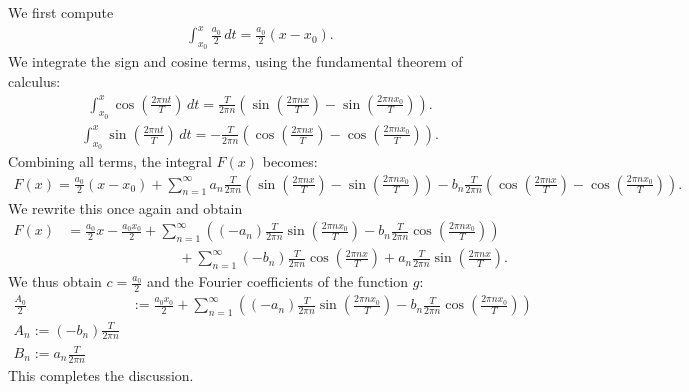 \documentclass[11pt]{article}
\begin{document}
\begin{solution}
    We first compute 
    \begin{gather*}
        \int_{x_0}^x \frac{a_0}{2} \, dt = \frac{a_0}{2} (x - x_0).
    \end{gather*}
    We integrate the sign and cosine terms, using the fundamental theorem of calculus:
    \begin{gather*}
        \int_{x_0}^x \cos\left(\frac{2\pi n t}{T}\right) \, dt 
        = 
        \frac{T}{2\pi n} \left( \sin\left(\frac{2\pi n x}{T}\right) - \sin\left(\frac{2\pi n x_0}{T}\right) \right).
    \end{gather*}
    \begin{gather*}
        \int_{x_0}^x \sin\left(\frac{2\pi n t}{T}\right) \, dt 
        = 
        -\frac{T}{2\pi n} \left( \cos\left(\frac{2\pi n x}{T}\right) - \cos\left(\frac{2\pi n x_0}{T}\right) \right).
    \end{gather*}
    Combining all terms, the integral \( F(x) \) becomes:
    \begin{gather*}
        F(x) 
        = 
        \frac{a_0}{2} (x - x_0) 
        + 
        \sum_{n=1}^\infty 
        a_n \frac{T}{2\pi n} \left( \sin\left(\frac{2\pi n x}{T}\right) - \sin\left(\frac{2\pi n x_0}{T}\right) \right) 
        - 
        b_n \frac{T}{2\pi n} \left( \cos\left(\frac{2\pi n x}{T}\right) - \cos\left(\frac{2\pi n x_0}{T}\right) \right).
    \end{gather*}
    We rewrite this once again and obtain
    \begin{align*}
        F(x) 
        &
        = 
        \frac{a_0}{2} x 
        - 
        \frac{a_0 x_0 }{2}
        + 
        \sum_{n=1}^\infty 
        \left( 
        (-a_n) \frac{T}{2\pi n} \sin\left(\frac{2\pi n x_0}{T}\right) 
        - 
        b_n \frac{T}{2\pi n} \cos\left(\frac{2\pi n x_0}{T}\right) 
        \right)
        \\&\qquad\qquad\qquad\qquad 
        + 
        \sum_{n=1}^\infty 
        (-b_n) \frac{T}{2\pi n} \cos\left(\frac{2\pi n x}{T}\right)
        + 
        a_n \frac{T}{2\pi n} \sin\left(\frac{2\pi n x}{T}\right) 
        .
    \end{align*}
    We thus obtain $c = \frac{a_0}{2}$ and the Fourier coefficients of the function $g$:
    \begin{align*}
        \frac{A_0}{2} &:= \frac{a_0 x_0 }{2}
        + 
        \sum_{n=1}^\infty 
        \left( 
        (-a_n) \frac{T}{2\pi n} \sin\left(\frac{2\pi n x_0}{T}\right) 
        - 
        b_n \frac{T}{2\pi n} \cos\left(\frac{2\pi n x_0}{T}\right) 
        \right)
        \\
        A_n := (-b_n) \frac{T}{2\pi n} 
        \\
        B_n := a_n \frac{T}{2\pi n} 
    \end{align*}
    This completes the discussion. 
\end{solution}
\end{document}

